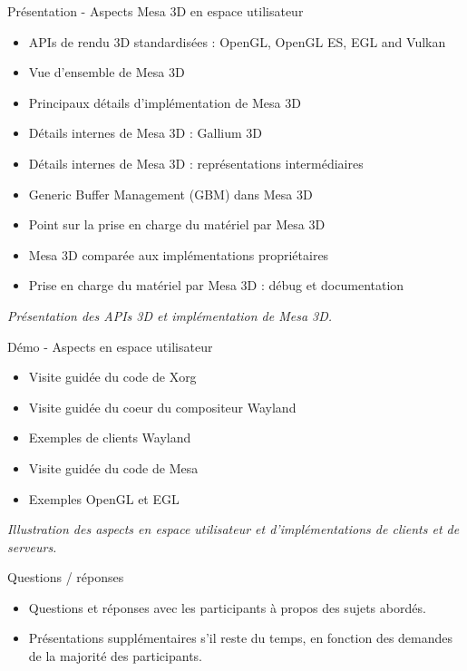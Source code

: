 \documentclass[a4paper,12pt,obeyspaces,spaces,hyphens]{article}
\begin{document}
\feagendatwocolumn
{Présentation - Aspects Mesa 3D en espace utilisateur}
{
  \begin{itemize}
  \item APIs de rendu 3D standardisées : OpenGL, OpenGL ES, EGL and Vulkan
  \item Vue d'ensemble de Mesa 3D
  \item Principaux détails d'implémentation de Mesa 3D
  \item Détails internes de Mesa 3D : Gallium 3D
  \item Détails internes de Mesa 3D : représentations intermédiaires
  \item Generic Buffer Management (GBM) dans Mesa 3D
  \item Point sur la prise en charge du matériel par Mesa 3D
  \item Mesa 3D comparée aux implémentations propriétaires
  \item Prise en charge du matériel par Mesa 3D : débug et documentation
  \end{itemize}
  \vspace{0.5em}
  {\em Présentation des APIs 3D et implémentation de Mesa 3D.}
}
{Démo - Aspects en espace utilisateur}
{
  \begin{itemize}
  \item Visite guidée du code de Xorg
  \item Visite guidée du coeur du compositeur Wayland
  \item Exemples de clients Wayland
  \item Visite guidée du code de Mesa
  \item Exemples OpenGL et EGL
  \end{itemize}
  \vspace{0.5em}
  {\em Illustration des aspects en espace utilisateur et
       d'implémentations de clients et de serveurs.}
}

\feagendaonecolumn
{Questions / réponses}
{
  \begin{itemize}
  \item Questions et réponses avec les participants à propos des sujets abordés.
  \item Présentations supplémentaires s'il reste du temps, en fonction des demandes
        de la majorité des participants.
  \end{itemize}
}
\end{document}
